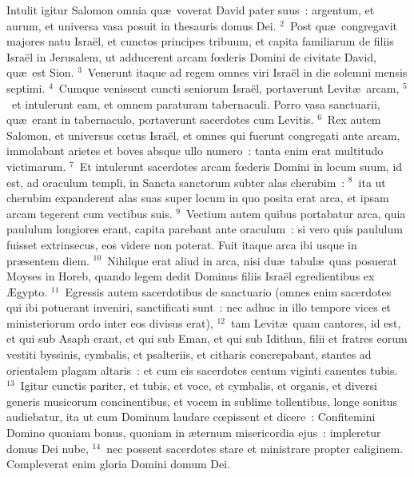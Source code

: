 \bchapter
\lettrine[lines=3,image=true,loversize=0.05,lraise=-0.03]{I}{}ntulit igitur Salomon omnia qu\ae\ voverat David pater suus~: argentum, et aurum, et universa vasa posuit in thesauris domus Dei.
${}^{2}$~Post qu\ae\ congregavit majores natu Isra\"el, et cunctos principes tribuum, et capita familiarum de filiis Isra\"el in Jerusalem, ut adducerent arcam fœderis Domini de civitate David, qu\ae\ est Sion.
${}^{3}$~Venerunt itaque ad regem omnes viri Isra\"el in die solemni mensis septimi.
${}^{4}$~Cumque venissent cuncti seniorum Isra\"el, portaverunt Levit\ae\ arcam,
${}^{5}$~et intulerunt eam, et omnem paraturam tabernaculi. Porro vasa sanctuarii, qu\ae\ erant in tabernaculo, portaverunt sacerdotes cum Levitis.
${}^{6}$~Rex autem Salomon, et universus cœtus Isra\"el, et omnes qui fuerunt congregati ante arcam, immolabant arietes et boves absque ullo numero~: tanta enim erat multitudo victimarum.
${}^{7}$~Et intulerunt sacerdotes arcam fœderis Domini in locum suum, id est, ad oraculum templi, in Sancta sanctorum subter alas cherubim~:
${}^{8}$~ita ut cherubim expanderent alas suas super locum in quo posita erat arca, et ipsam arcam tegerent cum vectibus suis.
${}^{9}$~Vectium autem quibus portabatur arca, quia paululum longiores erant, capita parebant ante oraculum~: si vero quis paululum fuisset extrinsecus, eos videre non poterat. Fuit itaque arca ibi usque in pr\ae sentem diem.
${}^{10}$~Nihilque erat aliud in arca, nisi du\ae\ tabul\ae\ quas posuerat Moyses in Horeb, quando legem dedit Dominus filiis Isra\"el egredientibus ex \AE gypto.
${}^{11}$~Egressis autem sacerdotibus de sanctuario (omnes enim sacerdotes qui ibi potuerant inveniri, sanctificati sunt~: nec adhuc in illo tempore vices et ministeriorum ordo inter eos divisus erat),
${}^{12}$~tam Levit\ae\ quam cantores, id est, et qui sub Asaph erant, et qui sub Eman, et qui sub Idithun, filii et fratres eorum vestiti byssinis, cymbalis, et psalteriis, et citharis concrepabant, stantes ad orientalem plagam altaris~: et cum eis sacerdotes centum viginti canentes tubis.
${}^{13}$~Igitur cunctis pariter, et tubis, et voce, et cymbalis, et organis, et diversi generis musicorum concinentibus, et vocem in sublime tollentibus, longe sonitus audiebatur, ita ut cum Dominum laudare cœpissent et dicere~: Confitemini Domino quoniam bonus, quoniam in \ae ternum misericordia ejus~: impleretur domus Dei nube,
${}^{14}$~nec possent sacerdotes stare et ministrare propter caliginem. Compleverat enim gloria Domini domum Dei.

